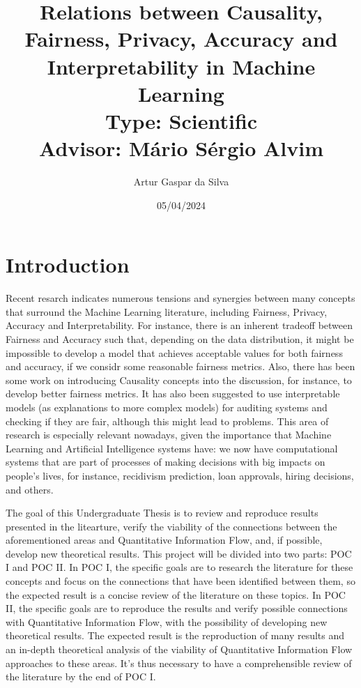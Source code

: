 \documentclass{article}
\title{Relations between Causality, Fairness, Privacy, Accuracy and Interpretability in Machine Learning\large\\ Type: Scientific\\Advisor: Mário Sérgio Alvim}
\author{Artur Gaspar da Silva}
\date{05/04/2024}
\begin{document}
\maketitle

\section{Introduction}

Recent resarch\cite{Sok}\cite{Reductions}\cite{Rachel}\cite{Awareness} indicates numerous tensions and synergies between many concepts that surround the Machine Learning literature, including Fairness, Privacy, Accuracy and Interpretability. For instance, there is an inherent tradeoff between Fairness and Accuracy such that, depending on the data distribution, it might be impossible to develop a model that achieves acceptable values for both fairness and accuracy, if we considr some reasonable fairness metrics\cite{Carlos}. Also, there has been some work on introducing Causality concepts into the discussion, for instance, to develop better fairness metrics\cite{CausalFair}. It has also been suggested to use interpretable models (as explanations to more complex models) for auditing systems and checking if they are fair, although this might lead to problems\cite{ExplainAll}. This area of research is especially relevant nowadays, given the importance that Machine Learning and Artificial Intelligence systems have: we now have computational systems that are part of processes of making decisions with big impacts on people's lives, for instance, recidivism prediction\cite{Compass}, loan approvals\cite{Loans}, hiring decisions\cite{Jobs}, and others.

The goal of this Undergraduate Thesis is to review and reproduce results presented in the litearture, verify the viability of the connections between the aforementioned areas and Quantitative Information Flow, and, if possible, develop new theoretical results. This project will be divided into two parts: POC I and POC II. In POC I, the specific goals are to research the literature for these concepts and focus on the connections that have been identified between them, so the expected result is a concise review of the literature on these topics. In POC II, the specific goals are to reproduce the results and verify possible connections with Quantitative Information Flow, with the possibility of developing new theoretical results. The expected result is the reproduction of many results and an in-depth theoretical analysis of the viability of Quantitative Information Flow approaches to these areas. It's thus necessary to have a comprehensible review of the literature by the end of POC I.
\end{document}
